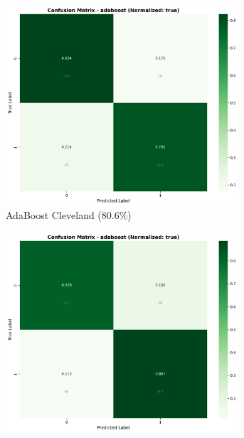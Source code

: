 \begin{figure}[H]
\centering
\begin{subfigure}[b]{0.31\textwidth}
\centering
\includegraphics[width=0.95\textwidth]{Result/cleveland_dataset/confusion_matrices/adaboost_numeric_dataset_StandardScaler.png}
\caption{AdaBoost Cleveland (80.6\%)}
\label{fig:ada_cleveland_performance}
\end{subfigure}
\hfill
\begin{subfigure}[b]{0.31\textwidth}
\centering
\includegraphics[width=0.95\textwidth]{Result/heart_dataset/confusion_matrices/adaboost_numeric_dataset_StandardScaler.png}

\end{subfigure}
\end{figure}
